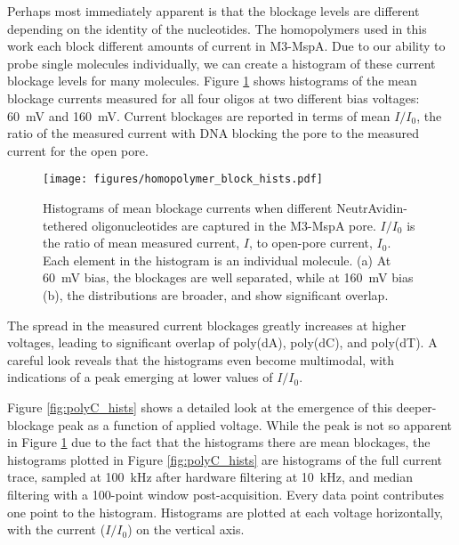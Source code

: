 Perhaps most immediately apparent is that the blockage levels are different depending on the identity of the nucleotides.  The homopolymers used in this work each block different amounts of current in M3-MspA.  Due to our ability to probe single molecules individually, we can create a histogram of these current blockage levels for many molecules.  Figure \ref{fig:homopolymer_blockage_hists} shows histograms of the mean blockage currents measured for all four oligos at two different bias voltages: \SI{60}{\mV} and \SI{160}{\mV}.  Current blockages are reported in terms of mean $I/I_0$, the ratio of the measured current with DNA blocking the pore to the measured current for the open pore.

\begin{figure}[!h]
\begin{centering}
\texttt{[image: figures/homopolymer\_block\_hists.pdf]}
\caption[Current blockage histograms for homopolymer ssDNA]{Histograms of mean blockage currents when different NeutrAvidin-tethered oligonucleotides are captured in the M3-MspA pore.  $I/I_0$ is the ratio of mean measured current, $I$, to open-pore current, $I_0$.  Each element in the histogram is an individual molecule.  (a) At \SI{60}{\mV} bias, the blockages are well separated, while at \SI{160}{\mV} bias (b), the distributions are broader, and show significant overlap.}
\label{fig:homopolymer_blockage_hists}
\end{centering}
\end{figure}

The spread in the measured current blockages greatly increases at higher voltages, leading to significant overlap of poly(dA), poly(dC), and poly(dT).  A careful look reveals that the histograms even become multimodal, with indications of a peak emerging at lower values of $I/I_0$.

Figure \ref{fig:polyC_hists} shows a detailed look at the emergence of this deeper-blockage peak as a function of applied voltage.  While the peak is not so apparent in Figure \ref{fig:homopolymer_blockage_hists} due to the fact that the histograms there are mean blockages, the histograms plotted in Figure \ref{fig:polyC_hists} are histograms of the full current trace, sampled at \SI{100}{\kHz} after hardware filtering at \SI{10}{\kHz}, and median filtering with a 100-point window post-acquisition.  Every data point contributes one point to the histogram.  Histograms are plotted at each voltage horizontally, with the current ($I/I_0$) on the vertical axis.

